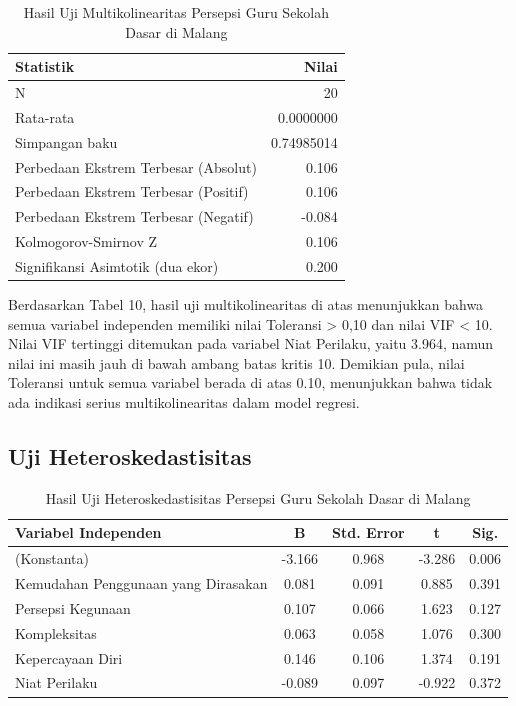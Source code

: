     \begin{table}[H]
        \centering
        \caption{Hasil Uji Multikolinearitas Persepsi Guru Sekolah Dasar di Malang}
        \label{tab:uji-multikolinearitas-guru}
        \begin{tabularx}{0.8\textwidth}{p{7cm}r}
            \toprule
            \textbf{Statistik} & \textbf{Nilai} \\
            \midrule
            N & 20 \\
            Rata-rata & 0.0000000 \\
            Simpangan baku & 0.74985014 \\
            Perbedaan Ekstrem Terbesar (Absolut) & 0.106 \\
            Perbedaan Ekstrem Terbesar (Positif) & 0.106 \\
            Perbedaan Ekstrem Terbesar (Negatif) & -0.084 \\
            Kolmogorov-Smirnov Z & 0.106 \\
            Signifikansi Asimtotik (dua ekor) & 0.200 \\
            \bottomrule
        \end{tabularx}
    \end{table}

    Berdasarkan Tabel 10, hasil uji multikolinearitas di atas menunjukkan bahwa semua variabel independen memiliki nilai Toleransi > 0,10 dan nilai VIF < 10. Nilai VIF tertinggi ditemukan pada variabel Niat Perilaku, yaitu 3.964, namun nilai ini masih jauh di bawah ambang batas kritis 10. Demikian pula, nilai Toleransi untuk semua variabel berada di atas 0.10, menunjukkan bahwa tidak ada indikasi serius multikolinearitas dalam model regresi. 

\subsection{Uji Heteroskedastisitas}

    \begin{table}[H]
        \centering
        \caption{Hasil Uji Heteroskedastisitas Persepsi Guru Sekolah Dasar di Malang}
        \label{tab:uji-heteroskedastisitas}
        \begin{tabularx}{\textwidth}{lcccc}
            \toprule
            \textbf{Variabel Independen} & \textbf{B} & \textbf{Std. Error} & \textbf{t} & \textbf{Sig.} \\
            \midrule
            (Konstanta) & -3.166 & 0.968 & -3.286 & 0.006 \\
            Kemudahan Penggunaan yang Dirasakan & 0.081 & 0.091 & 0.885 & 0.391 \\
            Persepsi Kegunaan & 0.107 & 0.066 & 1.623 & 0.127 \\
            Kompleksitas & 0.063 & 0.058 & 1.076 & 0.300 \\
            Kepercayaan Diri & 0.146 & 0.106 & 1.374 & 0.191 \\
            Niat Perilaku & -0.089 & 0.097 & -0.922 & 0.372 \\
            \bottomrule
        \end{tabularx}
    \end{table}

